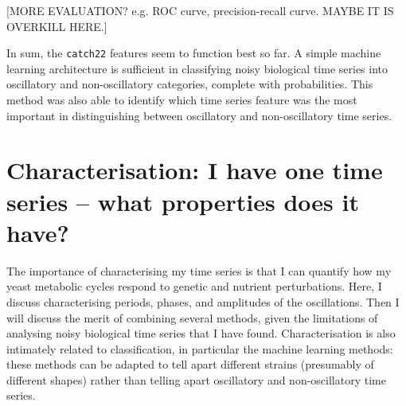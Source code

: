 [MORE EVALUATION? e.g. ROC curve, precision-recall curve.  MAYBE IT IS OVERKILL HERE.]

In sum,
the \texttt{catch22} features seem to function best so far.
A simple machine learning architecture is sufficient in classifying noisy biological time series into oscillatory and non-oscillatory categories, complete with probabilities.
This method was also able to identify which time series feature was the most important in distinguishing between oscillatory and non-oscillatory time series.

\section{Characterisation: I have one time series -- what properties does it have?}
\label{sec:analysis-characterisation}

The importance of characterising my time series is that I can quantify how my yeast metabolic cycles respond to genetic and nutrient perturbations.
Here, I discuss characterising periods, phases, and amplitudes of the oscillations.
Then I will discuss the merit of combining several methods, given the limitations of analysing noisy biological time series that I have found.
Characterisation is also intimately related to classification, in particular the machine learning methods: these methods can be adapted to tell apart different strains (presumably of different shapes) rather than telling apart oscillatory and non-oscillatory time series.

